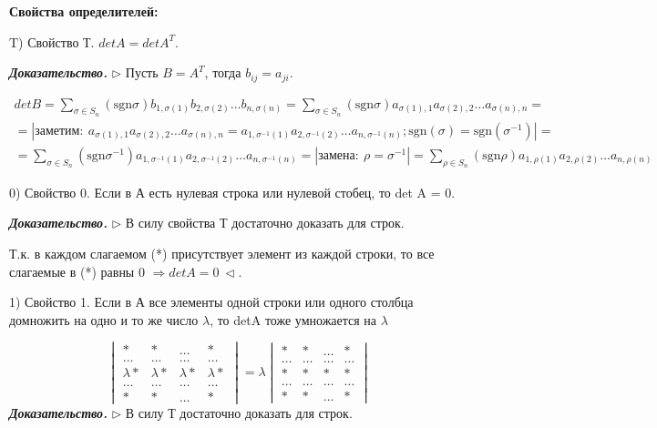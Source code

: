 \vspace{\baselineskip}
\textbf{Свойства определителей:}

\vspace{\baselineskip}
T) Свойство Т. $detA = detA^T$.

\vspace{\baselineskip}
\textbf{\textit{Доказательство.}} $\rhd$
Пусть $B = A^T$, тогда $b_{ij} = a_{ji}$. 

\begin{multline} detB = \sum\limits_{\sigma \in S_n} (\mathrm{sgn} \sigma) b_{1, \sigma(1)} b_{2, \sigma(2)} \dots b_{n, \sigma(n)} = \sum\limits_{\sigma \in S_n} (\mathrm{sgn} \sigma) a_{\sigma(1), 1} a_{\sigma(2), 2} \dots a_{\sigma(n), n} = \\ = | заметим: \ a_{\sigma (1) , 1} a_{\sigma (2), 2} \dots a_{\sigma (n), n} = a_{1, \sigma^{-1} (1)} a_{2, \sigma^{-1} (2)} \dots a_{n, \sigma^{-1} (n)}; \mathrm{sgn}(\sigma) = \mathrm{sgn}(\sigma^{-1}) | = \\ = \sum\limits_{\sigma \in S_n} (\mathrm{sgn} \sigma^{-1}) a_{1, \sigma^{-1}(1)} a_{2, \sigma^{-1}(2)} \dots a_{n, \sigma^{-1}(n)} = |замена: \ \rho = \sigma^{-1} | = \sum\limits_{\rho \in S_n} (\mathrm{sgn} \rho) a_{1, \rho(1)} a_{2, \rho(2)} \dots a_{n, \rho(n)} \end{multline}

\vspace{\baselineskip}
0) Свойство 0. Если в А есть нулевая строка или нулевой стобец, то det A = 0.

\vspace{\baselineskip}
\textbf{\textit{Доказательство.}} $\rhd$ В силу свойства Т достаточно доказать для строк.

Т.к. в каждом слагаемом (*) присутствует элемент из каждой строки, то все слагаемые в (*) равны 0 $\Rightarrow detA = 0 \ \lhd$.

\vspace{\baselineskip}
1) Свойство 1. Если в А все элементы одной строки или одного столбца домножить на одно и то же число $\lambda$, то detA тоже умножается на $\lambda$

\[
\begin{vmatrix} * & * & \dots & * \\ \dots & \dots & \dots & \dots \\ \lambda * & \lambda * & \lambda * & \lambda * \\ \dots & \dots & \dots & \dots \\ * & * & \dots & * \end{vmatrix} = \lambda \begin{vmatrix} * & * & \dots & * \\ \dots & \dots & \dots & \dots \\  * &  * & * & * \\ \dots & \dots & \dots & \dots \\ * & * & \dots & * \end{vmatrix}
\]
\textbf{\textit{Доказательство.}} $\rhd$ В силу Т достаточно доказать для строк. 

